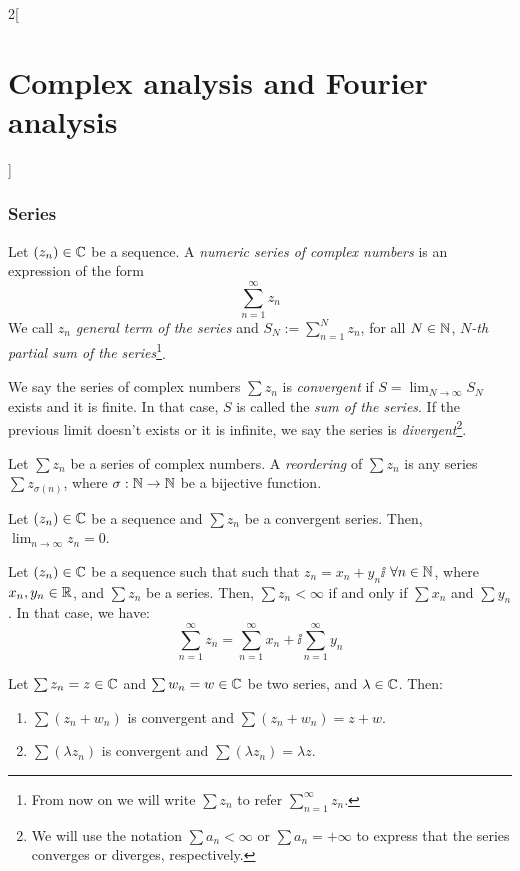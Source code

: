 \documentclass[../../../main.tex]{subfiles}
\begin{document}
\begin{multicols}{2}[\section{Complex analysis and Fourier analysis}]
  \subsubsection{Series}
  \begin{definition}
    Let $(z_n)\in\mathbb{C}$ be a sequence. A \emph{numeric series of complex numbers} is an expression of the form $$\sum_{n=1}^\infty z_n$$ We call $z_n$ \emph{general term of the series} and $\displaystyle S_N:=\sum_{n=1}^N z_n$, for all $N\in\mathbb{N} $, \emph{$N$-th partial sum of the series}\footnote{From now on we will write $\sum z_n$ to refer $\displaystyle\sum_{n=1}^\infty z_n$.}.
  \end{definition}
  \begin{definition}
    We say the series of complex numbers $\sum z_n$ is \emph{convergent} if $\displaystyle S=\lim_{N\to\infty}S_N$ exists and it is finite. In that case, $S$ is called the \emph{sum of the series}. If the previous limit doesn't exists or it is infinite, we say the series is \emph{divergent}\footnote{We will use the notation $\sum a_n<\infty$ or $\sum a_n=+\infty$ to express that the series converges or diverges, respectively.}.
  \end{definition}
  \begin{definition}
    Let $\sum z_n$ be a series of complex numbers.  A \emph{reordering} of $\sum z_n$ is any series $\sum z_{\sigma(n)}$, where $\sigma:\mathbb{N}\rightarrow\mathbb{N}$ be a bijective function.
  \end{definition}
  \begin{prop}
    Let $(z_n)\in\mathbb{C}$ be a sequence and $\sum z_n$ be a convergent series. Then, $\displaystyle\lim_{n\to\infty}z_n =0$.
  \end{prop}
  \begin{prop}
    Let $(z_n)\in\mathbb{C}$ be a sequence such that such that $z_n=x_n+y_n\ii$ $\forall n\in\mathbb{N}$, where $x_n,y_n\in\mathbb{R}$, and $\sum z_n$ be a series. Then, $\sum z_n<\infty$ if and only if $\sum x_n$ and $\sum y_n$. In that case, we have: $$\sum_{n=1}^\infty z_n=\sum_{n=1}^\infty x_n+\ii\sum_{n=1}^\infty y_n$$
  \end{prop}
  \begin{prop}
    Let $\sum z_n=z\in\mathbb{C}$ and $\sum w_n=w\in\mathbb{C}$ be two series, and $\lambda\in\mathbb{C}$. Then:
    \begin{enumerate}
      \item $\sum (z_n+w_n)$ is convergent and $\sum (z_n+w_n)=z+w$.
      \item $\sum (\lambda z_n)$ is convergent and $\sum (\lambda z_n)=\lambda z$.

\end{enumerate}
\end{prop}
\end{multicols}
\end{document}
